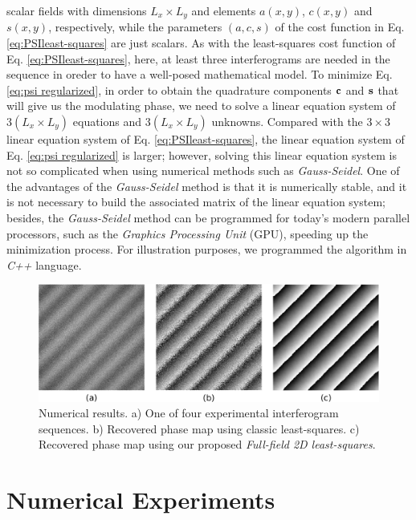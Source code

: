 scalar fields with dimensions $L_x\times L_y$ and elements $a(x,y)$,
$c(x,y)$ and $s(x,y)$, respectively, while the parameters
$(a,c,s)$ of the cost function in Eq. \eqref{eq:PSIleast-squares} are just scalars. As with the least-squares cost
function of Eq. \eqref{eq:PSIleast-squares}, here, at least three
interferograms are needed in the sequence in oreder to have a well-posed
mathematical model. To minimize Eq. \eqref{eq:psi regularized}, in
order to obtain the quadrature components $\bf c$ and $\bf s$ that
will give us the modulating phase, we need to solve a linear equation
system of $3(L_x\times L_y)$ equations and $3(L_x\times L_y)$
unknowns. Compared with the $3\times 3$ linear equation system of
Eq. \eqref{eq:PSIleast-squares}, the linear equation system of
Eq. \eqref{eq:psi regularized} is larger; however, solving this
linear equation system is not so complicated when using numerical
methods such as \emph{Gauss-Seidel}. One of the advantages of
the \emph{Gauss-Seidel} method is that it is numerically stable, and
it is not necessary to build the associated matrix of the linear
equation system; besides, the \emph{Gauss-Seidel} method can be
programmed for today's modern parallel processors, such as the
\emph{Graphics Processing Unit} (GPU), speeding up the minimization
process. For illustration purposes, we programmed the algorithm in
\emph{C++} language.
\begin{figure}[th!]
	\begin{center}
		\includegraphics[scale=0.25]{Chpt1_figures/Fig_1.eps}
	\end{center}
	\caption{Numerical results. a) One of four experimental 
	interferogram sequences. b) Recovered phase map using classic 
	least-squares. c) Recovered phase map using our proposed 
	\textit{Full-field 2D least-squares}.}
	\label{fig:SimPhaseComparison}
\end{figure}
\section{Numerical Experiments}


